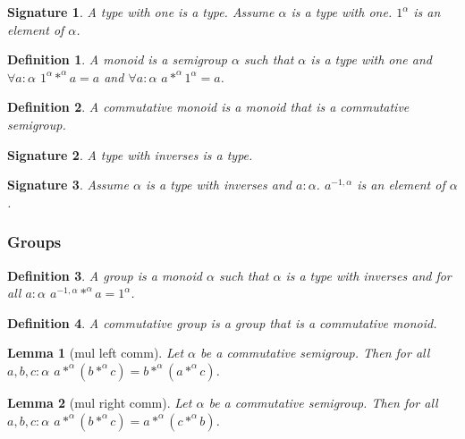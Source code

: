 \documentclass[12pt]{article}
\newtheorem{signature}{Signature}
\newtheorem{definition}{Definition}
\newtheorem{lemma}{Lemma}
\begin{document}
\begin{signature} A \emph{type with one} is a type.
Assume $\alpha$ is a type with one. $1^{\alpha}$ is an
element of $\alpha$.
\end{signature}

\begin{definition} A \emph{monoid} is a semigroup $\alpha$ such that $\alpha$ is a type
with one and
$\forall a : \alpha$ $1^{\alpha} *^{\alpha} a = a$ and
$\forall a : \alpha$ $a *^{\alpha} 1^{\alpha} = a$.
\end{definition}

\begin{definition} A \emph{commutative monoid} is a monoid that
is a commutative semigroup.\end{definition}

\begin{signature} A \emph{type with inverses} is a type. \end{signature}
\begin{signature} Assume $\alpha$ is a type with inverses and $a : \alpha$.
$a^{-1,\alpha}$ is an element of $\alpha$.
\end{signature}

\subsubsection*{Groups}

\begin{definition} A \emph{group} is a monoid $\alpha$ such that $\alpha$ is a type 
with inverses and 
for all $a : \alpha$ $a^{-1,\alpha} *^{\alpha} a = 1^{\alpha}$.
\end{definition}

\begin{definition} A \emph{commutative group} is a group that is a commutative
monoid.
\end{definition}

\begin{lemma}[mul left comm] Let $\alpha$ be a commutative semigroup.
Then for all $a,b,c : \alpha$
$a *^{\alpha} (b *^{\alpha} c) = b *^{\alpha} (a *^{\alpha} c)$.
\end{lemma}

\begin{lemma}[mul right comm] Let $\alpha$ be a commutative semigroup.
Then for all $a,b,c : \alpha$
$a *^{\alpha} (b *^{\alpha} c) = a *^{\alpha} (c *^{\alpha} b)$.
\end{lemma}
\end{document}
